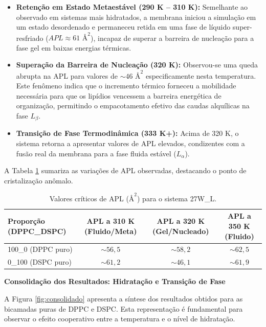 \begin{itemize}
    \item \textbf{Retenção em Estado Metaestável (290 K -- 310 K):} Semelhante ao observado em sistemas mais hidratados, a membrana iniciou a simulação em um estado desordenado e permaneceu retida em uma fase de líquido super-resfriado ($APL \approx 61 \text{ \AA}^2$), incapaz de superar a barreira de nucleação para a fase gel em baixas energias térmicas.
    
    \item \textbf{Superação da Barreira de Nucleação (320 K):} Observou-se uma queda abrupta na APL para valores de $\sim 46 \text{ \AA}^2$ especificamente nesta temperatura. Este fenômeno indica que o incremento térmico forneceu a mobilidade necessária para que os lipídios vencessem a barreira energética de organização, permitindo o empacotamento efetivo das caudas alquílicas na fase $L_\beta$.
    
    \item \textbf{Transição de Fase Termodinâmica (333 K+):} Acima de 320 K, o sistema retorna a apresentar valores de APL elevados, condizentes com a fusão real da membrana para a fase fluida estável ($L_\alpha$).
\end{itemize}

A Tabela \ref{tab:dados_27w} sumariza as variações de APL observadas, destacando o ponto de cristalização anômalo.

\begin{table}[htbp]
    \centering
    \caption{Valores críticos de APL ($\text{\AA}^2$) para o sistema 27W\_L.}
    \label{tab:dados_27w}
    \begin{tabular}{@{}lccc@{}}
        \toprule
        Proporção (DPPC\_DSPC) & APL a 310 K (Fluido/Meta) & APL a 320 K (Gel/Nucleado) & APL a 350 K (Fluido) \\ \midrule
        100\_0 (DPPC puro)     & $\sim 56,5$               & $\sim 58,2$                & $\sim 62,5$          \\
        0\_100 (DSPC puro)     & $\sim 61,2$               & $\sim 46,1$                & $\sim 61,9$          \\ \bottomrule
    \end{tabular}
\end{table}

\vspace{1em}
\noindent\textbf{Consolidação dos Resultados: Hidratação e Transição de Fase}

A Figura \ref{fig:consolidado} apresenta a síntese dos resultados obtidos para as bicamadas puras de DPPC e DSPC. Esta representação é fundamental para observar o efeito cooperativo entre a temperatura e o nível de hidratação.

